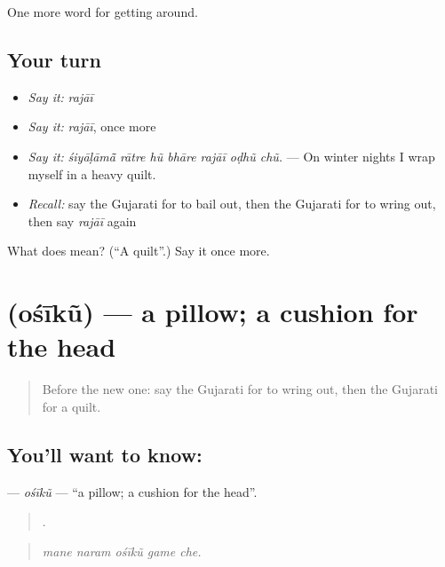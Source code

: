 \begin{grammarlens}[title={What you've built}]
One more word for getting around.
\end{grammarlens}

\subsection*{Your turn}
\begin{itemize}
\raggedright
  \item \emph{Say it:} \emph{rajāī}
  \item \emph{Say it:} \emph{rajāī}, once more
  \item \emph{Say it:} \emph{śiyāḷāmā̃ rātre hũ bhāre rajāī oḍhũ chũ.} — On winter nights I wrap myself in a heavy quilt.
  \item \emph{Recall:} say the Gujarati for to bail out, then the Gujarati for to wring out, then say \emph{rajāī} again
\end{itemize}

\begin{tcolorbox}[breakable,colback=teal!4,colframe=teal!35!black,title={Before you move on}]
What does  mean? (\textquotedblleft{}A quilt\textquotedblright{}.) Say it once more.
\end{tcolorbox}
\section[\texorpdfstring{\gu{ઓશીકું} (ośīkũ)}{ઓશીકું (ośīkũ)}]{ (ośīkũ) — a pillow; a cushion for the head}

\label{lesson:GU-C411-osiku}



\begin{quote}
Before the new one: say the Gujarati for to wring out, then the Gujarati for a quilt.
\end{quote}

\subsection*{You'll want to know: }
\textbf{} — \emph{ośīkũ} — \textquotedblleft{}a pillow; a cushion for the head\textquotedblright{}.

\begin{quote}
    .
\end{quote}

\begin{quote}
\emph{mane naram ośīkũ game che.}
\end{quote}

